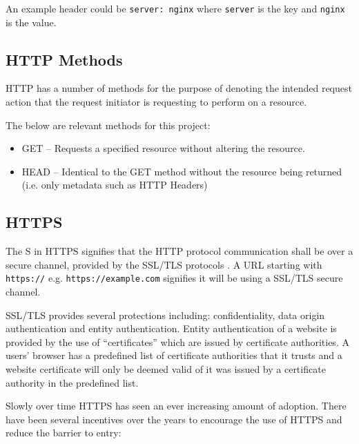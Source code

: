 \documentclass{mscreport}
\begin{document}
\vspace{0.3cm} \noindent
An example header could be \texttt{server: nginx} where \texttt{server} is the key and \texttt{nginx} is the value.

\subsection{HTTP Methods}

\noindent HTTP has a number of methods for the purpose of denoting the intended request action that the request initiator is requesting to perform on a resource.

\vspace{0.3cm} \noindent
The below are relevant methods for this project:
\begin{itemize}
	\setlength\itemsep{0.1em}
	\item GET – Requests a specified resource without altering the resource.
	\item HEAD – Identical to the GET method without the resource being returned (i.e. only metadata such as HTTP Headers)
\end{itemize}

\subsection{HTTPS}

\noindent
The S in HTTPS signifies that the HTTP protocol communication shall be over a secure channel, provided by the SSL/TLS protocols \cite{Rescorla2000-fs}. A URL starting with \texttt{https://} e.g. \texttt{https://example.com} signifies it will be using a SSL/TLS secure channel.

\vspace{0.3cm} \noindent 
SSL/TLS provides several protections including: confidentiality, data origin authentication and entity authentication. Entity authentication of a website is provided by the use of ``certificates'' which are issued by certificate authorities. A users' browser has a predefined list of certificate authorities that it trusts and a website certificate will only be deemed valid of it was issued by a certificate authority in the predefined list.


\vspace{0.3cm} \noindent
Slowly over time HTTPS has seen an ever increasing amount of adoption. There have been several incentives over the years to encourage the use of HTTPS and reduce the barrier to entry:
\end{document}
